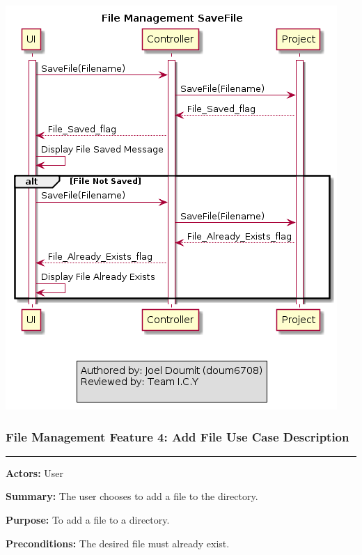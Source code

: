 \documentclass[twoside,letterpaper]{article}
\begin{document}
\includegraphics[width=\textwidth]{images/SequenceDiagrams/FM_SaveFile_Image}

\newpage

\subsubsection[File Management Feature 4: Add File Use Case Description]{\rmfamily\bfseries\color{black}
	File Management Feature 4: Add File Use Case Description}
\hypertarget{RefHeading22059017292}{}

\vspace{2pt}
\hrule
\vspace{8pt}
\textbf{Actors:} User \newline

\noindent\textbf{Summary:} The user chooses to add a file to the directory. \newline

\noindent\textbf{Purpose:} To add a file to a directory. \newline

\noindent\textbf{Preconditions:} The desired file must already exist. \newline
\end{document}
